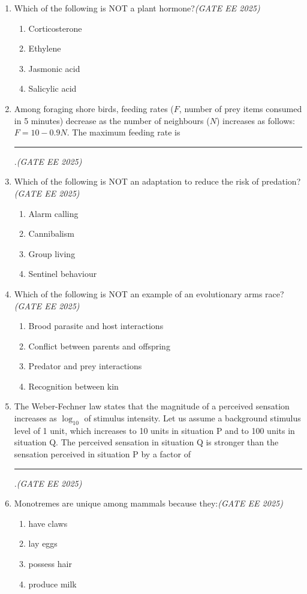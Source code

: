 \begin{enumerate}[leftmargin=*,label=\textbf{Q.\arabic*},resume]
\item Which of the following is NOT a plant hormone?\hfill \textit{(GATE EE 2025)}
\begin{enumerate}[label=(\Alph*)]
\item Corticosterone
\item Ethylene
\item Jasmonic acid
\item Salicylic acid
\end{enumerate}

\item Among foraging shore birds, feeding rates ($F$, number of prey items consumed in 5 minutes) decrease as the number of neighbours ($N$) increases as follows: $F = 10 - 0.9 N$. The maximum feeding rate is \rule{2cm}{0.15mm}.\hfill \textit{(GATE EE 2025)}

\item Which of the following is NOT an adaptation to reduce the risk of predation?\hfill \textit{(GATE EE 2025)}
\begin{enumerate}[label=(\Alph*)]
\item Alarm calling
\item Cannibalism
\item Group living
\item Sentinel behaviour
\end{enumerate}

\item Which of the following is NOT an example of an evolutionary arms race?\hfill \textit{(GATE EE 2025)}
\begin{enumerate}[label=(\Alph*)]
\item Brood parasite and host interactions
\item Conflict between parents and offspring
\item Predator and prey interactions
\item Recognition between kin
\end{enumerate}

\item The Weber-Fechner law states that the magnitude of a perceived sensation increases as $\log_{10}$ of stimulus intensity. Let us assume a background stimulus level of 1 unit, which increases to 10 units in situation P and to 100 units in situation Q. The perceived sensation in situation Q is stronger than the sensation perceived in situation P by a factor of \rule{2cm}{0.15mm}.\hfill \textit{(GATE EE 2025)}

\item Monotremes are unique among mammals because they:\hfill \textit{(GATE EE 2025)}
\begin{multicols}{2}
\begin{enumerate}[label=(\Alph*)]
\item have claws
\item lay eggs
\item possess hair
\item produce milk
\end{enumerate}
\end{multicols}
\end{enumerate}
